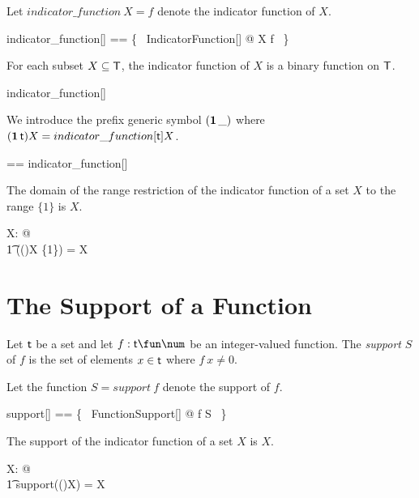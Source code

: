 \documentclass{amsart}
\begin{document}
Let $indicator\_function~X = f$ denote the indicator function of $X$.

\begin{zed}
	indicator\_function[\genT] == \{~ IndicatorFunction[\genT] @ X \mapsto f ~\}
\end{zed}

\begin{remark}
For each subset $X \subseteq \mathsf{T}$, the indicator function of $X$ is a binary function on $\mathsf{T}$.
\begin{zed}
	indicator\_function[\setT] \in \power \setT \fun \setT \fun \B
\end{zed}
\end{remark}

We introduce the prefix generic symbol $(\operatorname{\mathbf{1}} \_)$ where $(\operatorname{\mathbf{1}} \mathsf{t})X = indicator\_function[\mathsf{t}] X$.

\begin{zed}
	\indF \genT == indicator\_function[\genT]
\end{zed}

\begin{remark}
The domain of the range restriction of the indicator function of a set $X$ to the range $\{1\}$ is $X$.
\begin{zed}
	\forall X: \power \setT @ \\
	\t1	\dom((\indF \setT)X \rres \{1\}) = X
\end{zed}
\end{remark}

\section{The Support of a Function}

Let $\mathsf{t}$ be a set and let $f: \genT \fun \num$ be an integer-valued function.
The \textit{support} $S$ of $f$ is the set of elements $x \in \mathsf{t}$ where $f~x \neq 0$.


Let the function $S = support~f$ denote the support of $f$.

\begin{zed}
	support[\genT] == \{~ FunctionSupport[\genT] @ f \mapsto S ~\}
\end{zed}

\begin{example}
The support of the indicator function of a set $X$ is $X$.
\begin{zed}
	\forall X: \power \setT @ \\
	\t1 support((\indF \setT)X) = X
\end{zed}
\end{example}
\end{document}
